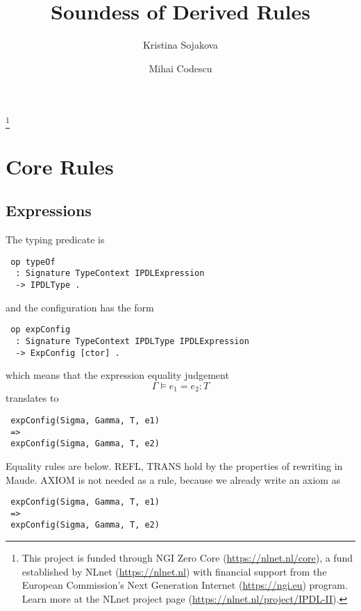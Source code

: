 \documentclass{article}
\title{Soundess of Derived Rules}
\author{Kristina Sojakova \and Mihai Codescu}
\date{}
\begin{document}
\maketitle\footnote{This project is funded through NGI Zero Core (\url{https://nlnet.nl/core}), a fund established by NLnet (\url{https://nlnet.nl}) with financial support from the European Commission's Next Generation Internet (\url{https://ngi.eu}) program. Learn more at the NLnet project page (\url{https://nlnet.nl/project/IPDL-II}).}

\section{Core Rules}

\subsection{Expressions}

The typing predicate is
\begin{lstlisting}
 op typeOf 
  : Signature TypeContext IPDLExpression  
  -> IPDLType .
\end{lstlisting}

\noindent and the configuration has the form

\begin{lstlisting}
 op expConfig 
  : Signature TypeContext IPDLType IPDLExpression 
  -> ExpConfig [ctor] .
\end{lstlisting}

\noindent which means that the expression equality judgement
$$\Gamma \vDash e_1 = e_2 : T$$
translates to
\begin{lstlisting}
 expConfig(Sigma, Gamma, T, e1)
 =>
 expConfig(Sigma, Gamma, T, e2) 
\end{lstlisting}

Equality rules are below. 
 REFL, TRANS hold by the properties of rewriting in Maude.
 AXIOM is not needed as a rule, because we already write an axiom as
\begin{lstlisting}
 expConfig(Sigma, Gamma, T, e1)
 =>
 expConfig(Sigma, Gamma, T, e2) 
\end{lstlisting} 
\end{document}

